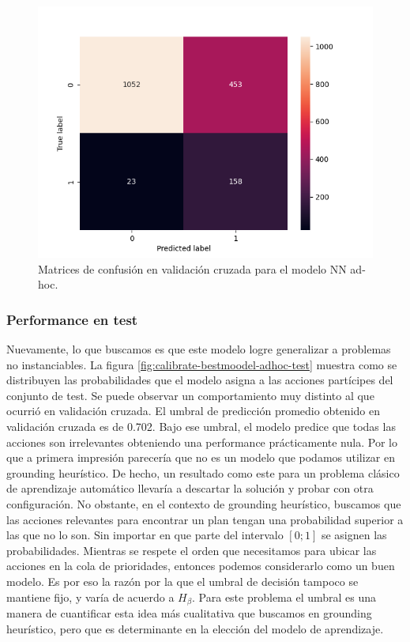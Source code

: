 \begin{figure}[h!]
    \includegraphics[width=\linewidth]{figures/results/ad-hoc/nn/calibrate/2021-12-06_17.03.17.314982_set_5_confusion_matrix_raw.png}
    \endminipage
    \caption{Matrices de confusión en validación cruzada para el modelo NN ad-hoc.}
    \label{fig:calibrate-bestmodel-cm}
\end{figure}

\subsubsection{Performance en test}


Nuevamente, lo que buscamos es que este modelo logre generalizar a problemas no
instanciables. La figura \ref{fig:calibrate-bestmoodel-adhoc-test} muestra como
se distribuyen las probabilidades que el modelo asigna a las acciones partícipes
del conjunto de test. Se puede observar un comportamiento muy distinto al que
ocurrió en validación cruzada. El umbral de predicción promedio obtenido en
validación cruzada es de 0.702. Bajo ese umbral, el modelo predice que todas las
acciones son irrelevantes obteniendo una performance prácticamente nula. Por lo
que a primera impresión parecería que no es un modelo que podamos utilizar en
grounding heurístico. De hecho, un resultado como este para un problema clásico
de aprendizaje automático llevaría a descartar la solución y probar con otra
configuración. No obstante, en el contexto de grounding heurístico, buscamos que
las acciones relevantes para encontrar un plan tengan una probabilidad superior
a las que no lo son. Sin importar en que parte del intervalo $[0;1]$ se asignen
las probabilidades. Mientras se respete el orden que necesitamos para ubicar las
acciones en la cola de prioridades, entonces podemos considerarlo como un buen
modelo. Es por eso la razón por la que el umbral de decisión tampoco se mantiene
fijo, y varía de acuerdo a $H_{\beta}$. Para este problema el umbral es una
manera de cuantificar esta idea más cualitativa que buscamos en grounding
heurístico, pero que es determinante en la elección del modelo de aprendizaje.

